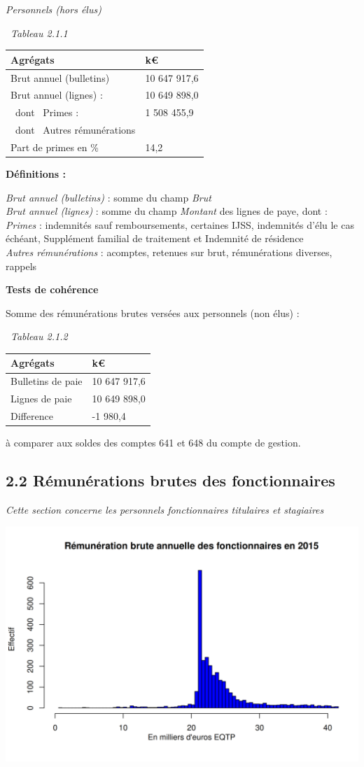 \emph{Personnels (hors élus)}

~\emph{Tableau 2.1.1}

\begin{longtable}[]{@{}ll@{}}
\toprule
Agrégats & k€\tabularnewline
\midrule
\endhead
Brut annuel (bulletins) & 10 647 917,6\tabularnewline
Brut annuel (lignes) : & 10 649 898,0\tabularnewline
~dont ~Primes : & 1 508 455,9\tabularnewline
~dont ~Autres rémunérations &\tabularnewline
Part de primes en \% & 14,2\tabularnewline
\bottomrule
\end{longtable}

\textbf{Définitions :}

\emph{Brut annuel (bulletins)} : somme du champ \emph{Brut}\\
\emph{Brut annuel (lignes)} : somme du champ \emph{Montant} des lignes
de paye, dont :\\
\emph{Primes} : indemnités sauf remboursements, certaines IJSS,
indemnités d'élu le cas échéant, Supplément familial de traitement et
Indemnité de résidence\\
\emph{Autres rémunérations} : acomptes, retenues sur brut, rémunérations
diverses, rappels

\textbf{Tests de cohérence}

Somme des rémunérations brutes versées aux personnels (non élus) :

~\emph{Tableau 2.1.2}

\begin{longtable}[]{@{}ll@{}}
\toprule
Agrégats & k€\tabularnewline
\midrule
\endhead
Bulletins de paie & 10 647 917,6\tabularnewline
Lignes de paie & 10 649 898,0\tabularnewline
Difference & -1 980,4\tabularnewline
\bottomrule
\end{longtable}

à comparer aux soldes des comptes 641 et 648 du compte de gestion.

\hypertarget{remunerations-brutes-des-fonctionnaires}{%
\subsection{2.2 Rémunérations brutes des
fonctionnaires}\label{remunerations-brutes-des-fonctionnaires}}

\emph{Cette section concerne les personnels fonctionnaires titulaires et
stagiaires}

\includegraphics{altair_files/figure-latex/unnamed-chunk-43-1.png}

